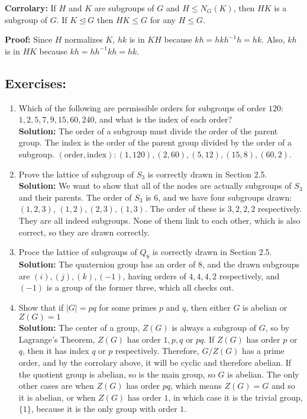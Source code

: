 \documentclass{article}
\begin{document}
\textbf{Corrolary:} If $H$ and $K$ are subgroups of $G$ and $H \leq N_G(K)$, then $HK$ is a subgroup of $G$. If $K \trianglelefteq G$ then $HK \leq G$ for any $H \leq G$.

\textbf{Proof:} Since $H$ normalizes $K$, $hk$ is in $KH$ because $kh = hkh ^{-1} h = hk$. Also, $kh$ is in $HK$ because $kh = h h ^{-1} kh = hk$. 

\subsection{Exercises:}

\begin{enumerate}
    \item Which of the following are permissible orders for subgroups of order $120$: $1,2,5,7,9,15,60,240$, and what is the index of each order? \\ \textbf{Solution:} The order of a subgroup must divide the order of the parent group. The index is the order of the parent group divided by the order of a subgroup. $(\text{order},\text{index}): (1,120), (2,60), (5,12), (15,8), (60,2)$.
    \item Prove the lattice of subgroup of $S_3$ is correctly drawn in Section 2.5. \\ \textbf{Solution:} We want to show that all of the nodes are actually subgroups of $S_3$ and their parents. The order of $S_3$ is 6, and we have four subgroups drawn: $(1,2,3)$, $(1,2),(2,3),(1,3)$. The order of these is $3,2,2,2$ respectively. They are all indeed subgroups. None of them link to each other, which is also correct, so they are drawn correctly. 
    \item Proce the lattice of subgroups of $Q_8$ is correctly drawn in Section 2.5. \\ \textbf{Solution:} The quaternion group has an order of $8$, and the drawn subgroups are $(i),(j),(k),(-1)$, having orders of $4,4,4,2$ respectively, and $(-1)$ is a group of the former three, which all checks out.
    \item Show that if $\vert G \vert = pq$ for some primes $p$ and $q$, then either $G$ is abelian or $Z(G) = 1$ \\ \textbf{Solution:} The center of a group, $Z(G)$ is always a subgroup of $G$, so by Lagrange's Theorem, $Z(G)$ has order $1,p,q$ or $pq$. If $Z(G)$ has order $p$ or $q$, then it has index $q$ or $p$ respectively. Therefore, $G/Z(G)$ has a prime order, and by the corrolary above, it will be cyclic and therefore abelian. If the quotient group is abelian, so is the main group, so $G$ is abelian. The only other cases are when $Z(G)$ has order $pq$, which means $Z(G) = G$ and so it is abelian, or when $Z(G)$ has order $1$, in which case it is the trivial group, $\{1\}$, because it is the only group with order $1$. 
\end{enumerate}
\end{document}
